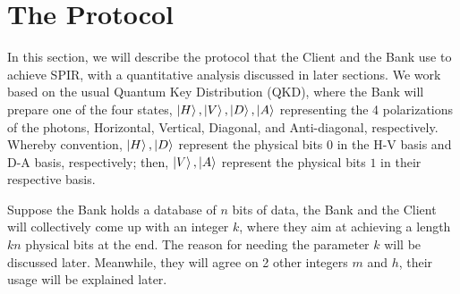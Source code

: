 \documentclass[%
 reprint,
superscriptaddress,
 amsmath,amssymb,
 aps,
]{revtex4-2}
\begin{document}
\section{The Protocol}
\label{sec:the_protocol}
In this section, we will describe the protocol that the Client and the Bank use to achieve SPIR, with a quantitative analysis discussed in later sections. We work based on the usual Quantum Key Distribution (QKD), where the Bank will prepare one of the four states, $\ket{H}, \ket{V}, \ket{D}, \ket{A}$ representing the 4 polarizations of the photons, Horizontal, Vertical, Diagonal, and Anti-diagonal, respectively. Whereby convention, $\ket{H}, \ket{D}$ represent the physical bits $0$ in the H-V basis and D-A basis, respectively; then, $\ket{V}, \ket{A}$ represent the physical bits $1$ in their respective basis.

Suppose the Bank holds a database of $n$ bits of data, the Bank and the Client will collectively come up with an integer $k$, where they aim at achieving a length $kn$ physical bits at the end. The reason for needing the parameter $k$ will be discussed later. Meanwhile, they will agree on 2 other integers $m$ and $h$, their usage will be explained later. 
\end{document}
